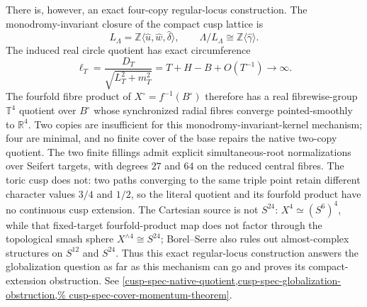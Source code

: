 \begin{enumerate}[leftmargin=1.8em,itemsep=.65em]
There is, however, an exact four-copy regular-locus construction.  The
monodromy-invariant closure of the compact cusp lattice is
\[
 L_\Lambda=\mathbb Z\langle\widehat u,\widehat w,\widehat\delta\rangle,
\qquad
 \Lambda/L_\Lambda\cong\mathbb Z\langle\widehat\gamma\rangle.
\]
The induced real circle quotient has exact circumference
\[
 \ell_T=\frac{D_T}{\sqrt{L_T^2+m_T^2}}
     =T+H-B+O(T^{-1})\longrightarrow\infty.
\]
The fourfold fibre product of \(X^\circ=f^{-1}(B^\circ)\) therefore has a
real fibrewise-group \(\mathbb T^4\) quotient over \(B^\circ\) whose
synchronized radial fibres converge pointed-smoothly to \(\mathbb R^4\).
Two copies are insufficient for this monodromy-invariant-kernel mechanism;
four are minimal, and no finite cover of the base repairs the native two-copy
quotient.  The two finite fillings admit explicit simultaneous-root
normalizations over Seifert targets, with degrees \(27\) and \(64\) on the
reduced central fibres.  The toric cusp does not: two paths converging to the
same triple point retain different character values \(3/4\) and \(1/2\), so
the literal quotient and its fourfold product have no continuous cusp
 extension.  The Cartesian source is not \(S^{24}\):
 \(X^4\simeq(S^6)^4\), while that fixed-target fourfold-product map does not
 factor through the topological smash sphere
\(X^{\wedge4}\cong S^{24}\); Borel--Serre also rules out almost-complex
structures on \(S^{12}\) and \(S^{24}\).  Thus this exact regular-locus
construction answers the globalization question as far as this mechanism can
go and proves its compact-extension obstruction.  See
 \cref{cusp-spec-native-quotient,cusp-spec-globalization-obstruction,%
 cusp-spec-cover-momentum-theorem}.


\end{enumerate}
